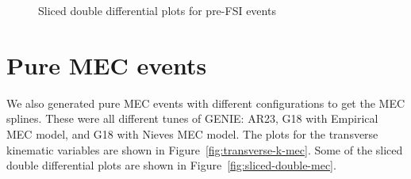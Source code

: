 \documentclass{article}
\begin{document}
\begin{figure}
    \caption{Sliced double differential plots for pre-FSI events}
    \label{fig:sliced-double-differential-cos-mu-no-fsi}
\end{figure}

\section{Pure MEC events}

We also generated pure MEC events with different configurations to get the MEC splines. These were all different tunes of GENIE: AR23, G18 with Empirical MEC model, and G18 with Nieves MEC model. The plots for the transverse kinematic variables are shown in Figure~\ref{fig:transverse-k-mec}. Some of the sliced double differential plots are shown in Figure~\ref{fig:sliced-double-mec}.
\end{document}
